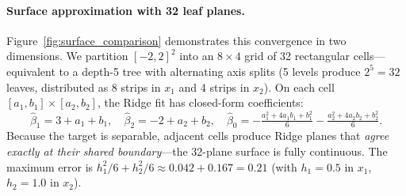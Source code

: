 \documentclass[11pt,a4paper]{article}
\begin{document}
\paragraph{Surface approximation with 32 leaf planes.}
Figure~\ref{fig:surface_comparison} demonstrates this convergence in two dimensions. We partition $[-2,2]^2$ into an $8 \times 4$ grid of 32 rectangular cells---equivalent to a depth-5 tree with alternating axis splits (5 levels produce $2^5 = 32$ leaves, distributed as 8 strips in $x_1$ and 4 strips in $x_2$). On each cell $[a_1, b_1] \times [a_2, b_2]$, the Ridge fit has closed-form coefficients:
\[
    \hat{\beta}_1 = 3 + a_1 + b_1, \quad \hat{\beta}_2 = -2 + a_2 + b_2, \quad \hat{\beta}_0 = -\tfrac{a_1^2 + 4a_1 b_1 + b_1^2}{6} - \tfrac{a_2^2 + 4a_2 b_2 + b_2^2}{6}.
\]
Because the target is separable, adjacent cells produce Ridge planes that \emph{agree exactly at their shared boundary}---the 32-plane surface is fully continuous. The maximum error is $h_1^2/6 + h_2^2/6 \approx 0.042 + 0.167 = 0.21$ (with $h_1 = 0.5$ in $x_1$, $h_2 = 1.0$ in $x_2$).
\end{document}
